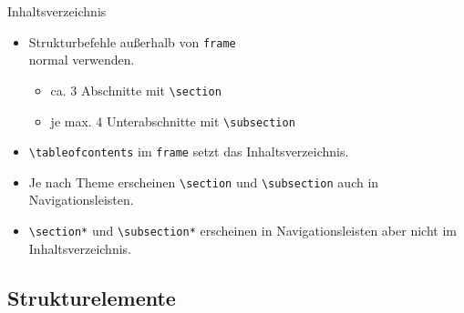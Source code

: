 
\begin{Frame}[fragile]{Inhaltsverzeichnis}
  \begin{itemize}
    \item Strukturbefehle außerhalb von \lstinline-frame-\\
      normal verwenden.
      \begin{itemize}
        \item ca. 3 Abschnitte mit \lstinline-\section-
        \item je max. 4 Unterabschnitte mit \lstinline-\subsection-
      \end{itemize}
    \item \lstinline-\tableofcontents- im \lstinline-frame- setzt das Inhaltsverzeichnis.
    \item Je nach Theme erscheinen \lstinline-\section- und
      \lstinline-\subsection- auch in Navigationsleisten.
    \item \lstinline-\section*- und \lstinline-\subsection*- erscheinen in
      Navigationsleisten aber nicht im Inhaltsverzeichnis.
  \end{itemize}
\end{Frame}

\subsection{Strukturelemente}

